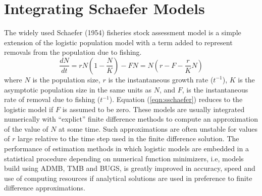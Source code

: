 \section{Integrating Schaefer Models}
\label{sec:schaefer}
The widely used Schaefer (1954) fisheries stock assessment model 
is a simple
extension of the logistic population model with a term added to
represent removals from the population due to fishing.
\begin{equation}
\label{eqn:sschaefer}
\frac{dN}{dt} = rN(1-\frac{N}{K}) - FN = N(r-F-\frac{r}{K}N)
\end{equation}
where $N$ is the population size,
$r$ is the instantaneous growth rate ($t^{-1}$),
$K$ is the asymptotic population size in the same units as $N$,
and $F$, is the instantaneous rate of removal due to fishing ($t^{-1}$).
Equation (\ref{eqn:sschaefer}) reduces to the logistic model
if $F$ is assumed to be zero.
These models are usually integrated numerically with
``explict'' finite difference methods to compute an approximation 
of the value of $N$ at some time. 
Such approximations are often unstable for 
values of $r$ large relative to the time step used in the finite
difference solution.
The performance of estimation methods in which logistic models
are embedded in a statistical procedure depending on numerical function
minimizers, i.e, models build using ADMB, TMB and BUGS,
is greatly improved in accuracy, speed and use of
computing resources if analytical solutions are used in preference
to finite difference approximations. 

